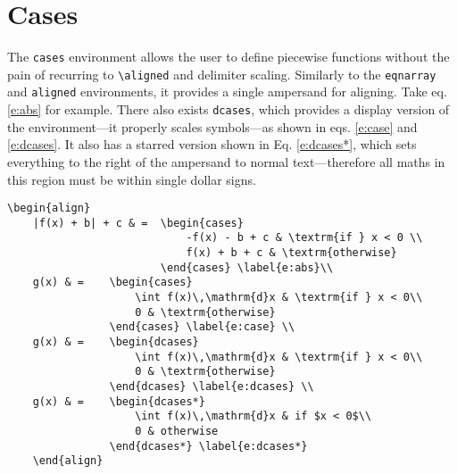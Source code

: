 \section{Cases}
%
The \verb|cases| environment allows the user to define piecewise
functions without the pain of recurring to \verb|\aligned| and
delimiter scaling.  Similarly to the \verb|eqnarray| and
\verb|aligned| environments, it provides a single ampersand for
aligning.  Take eq. \eqref{e:abs} for example.  There also exists
\verb|dcases|, which provides a display version of the
environment---it properly scales symbols---as shown in eqs.
\eqref{e:case} and \eqref{e:dcases}.  It also has a starred version
shown in Eq. \eqref{e:dcases*}, which sets everything to the right of
the ampersand to normal text---therefore all maths in this region must
be within single dollar signs.
\begin{verbatim}
\begin{align}
    |f(x) + b| + c & =  \begin{cases}
                            -f(x) - b + c & \textrm{if } x < 0 \\
                            f(x) + b + c & \textrm{otherwise}
                        \end{cases} \label{e:abs}\\
    g(x) & =    \begin{cases}
                    \int f(x)\,\mathrm{d}x & \textrm{if } x < 0\\
                    0 & \textrm{otherwise}
                \end{cases} \label{e:case} \\
    g(x) & =    \begin{dcases}
                    \int f(x)\,\mathrm{d}x & \textrm{if } x < 0\\
	                0 & \textrm{otherwise}
                \end{dcases} \label{e:dcases} \\
    g(x) & =    \begin{dcases*}
                    \int f(x)\,\mathrm{d}x & if $x < 0$\\
                    0 & otherwise
                \end{dcases*} \label{e:dcases*}
	\end{align}
\end{verbatim}

